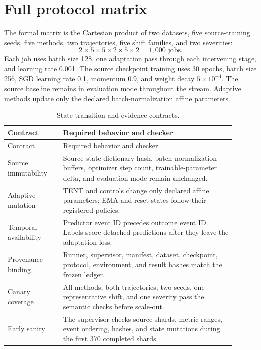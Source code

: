 \documentclass[11pt]{article}
\begin{document}
\appendix
\section{Full protocol matrix}
\label{app:matrix}

The formal matrix is the Cartesian product of two datasets, five source-training seeds, five methods, two trajectories, five shift families, and two severities:
\[
2\times5\times5\times2\times5\times2=1{,}000\text{ jobs}.
\]
Each job uses batch size 128, one adaptation pass through each intervening stage, and learning rate 0.001. The source checkpoint training uses 30 epochs, batch size 256, SGD learning rate 0.1, momentum 0.9, and weight decay $5\times10^{-4}$. The source baseline remains in evaluation mode throughout the stream. Adaptive methods update only the declared batch-normalization affine parameters.

\begin{longtable}{p{0.22\linewidth}p{0.68\linewidth}}
\caption{State-transition and evidence contracts.}\label{tab:contracts}\\
\toprule
Contract & Required behavior and checker \\
\midrule
\endfirsthead
\toprule
Contract & Required behavior and checker \\
\midrule
\endhead
Source immutability & Source state dictionary hash, batch-normalization buffers, optimizer step count, trainable-parameter delta, and evaluation mode remain unchanged. \\
Adaptive mutation & TENT and controls change only declared affine parameters; EMA and reset states follow their registered policies. \\
Temporal availability & Predictor event ID precedes outcome event ID. Labels score detached predictions after they leave the adaptation loss. \\
Provenance binding & Runner, supervisor, manifest, dataset, checkpoint, protocol, environment, and result hashes match the frozen ledger. \\
Canary coverage & All methods, both trajectories, two seeds, one representative shift, and one severity pass the semantic checks before scale-out. \\
Early sanity & The supervisor checks source shards, metric ranges, event ordering, hashes, and state mutations during the first 370 completed shards. \\
\bottomrule
\end{longtable}
\end{document}
